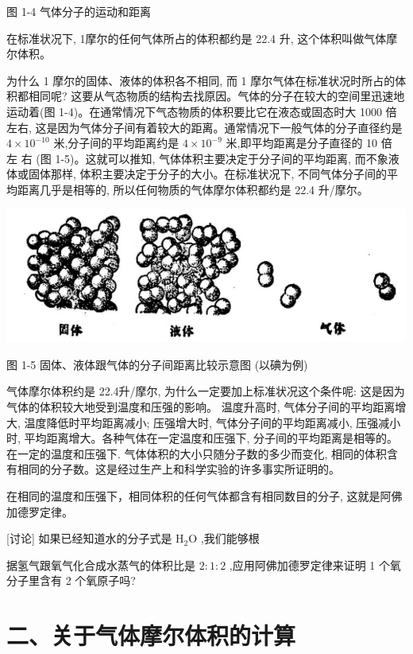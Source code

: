 \documentclass[10pt]{article}
\begin{document}
图 1-4 气体分子的运动和距离

在标准状况下, 1摩尔的任何气体所占的体积都约是 22.4 升, 这个体积叫做气体摩尔体积。

为什么 1 摩尔的固体、液体的体积各不相同, 而 1 摩尔气体在标准状况时所占的体积都相同呢? 这要从气态物质的结构去找原因。气体的分子在较大的空间里迅速地运动着(图 1-4)。在通常情况下气态物质的体积要比它在液态或固态时大 1000 倍左右, 这是因为气体分子间有着较大的距离。通常情况下一般气体的分子直径约是 \(4 \times {10}^{-{10}}\) 米,分子间的平均距离约是 \(4 \times {10}^{-9}\) 米,即平均距离是分子直径的 10 倍 左 右 (图 1-5)。这就可以推知, 气体体积主要决定于分子间的平均距离, 而不象液体或固体那样, 体积主要决定于分子的大小。在标准状况下, 不同气体分子间的平均距离几乎是相等的, 所以任何物质的气体摩尔体积都约是 22.4 升/摩尔。

\begin{center}
\includegraphics[max width=1.0\textwidth]{images/01912d0f-097c-7e75-8f32-4f326cd86c9f_16_685048.jpg}
\end{center}

图 1-5 固体、液体跟气体的分子间距离比较示意图 (以碘为例)

气体摩尔体积约是 22.4升/摩尔, 为什么一定要加上标准状况这个条件呢: 这是因为气体的体积较大地受到温度和压强的影响。 温度升高时, 气体分子间的平均距离增大, 温度降低时平均距离减小; 压强增大时, 气体分子间的平均距离减小, 压强减小时, 平均距离增大。各种气体在一定温度和压强下, 分子间的平均距离是相等的。在一定的温度和压强下. 气体体积的大小只随分子数的多少而变化, 相同的体积含有相同的分子数。这是经过生产上和科学实验的许多事实所证明的。

在相同的温度和压强下，相同体积的任何气体都含有相同数目的分子, 这就是阿佛加德罗定律。

[讨论] 如果已经知道水的分子式是 \({\mathrm{H}}_{2}\mathrm{O}\) ,我们能够根

据氢气跟氧气化合成水蒸气的体积比是 \(2 : 1 : 2\) ,应用阿佛加德罗定律来证明 1 个氧分子里含有 2 个氧原子吗?

\section*{二、关于气体摩尔体积的计算}
\end{document}
